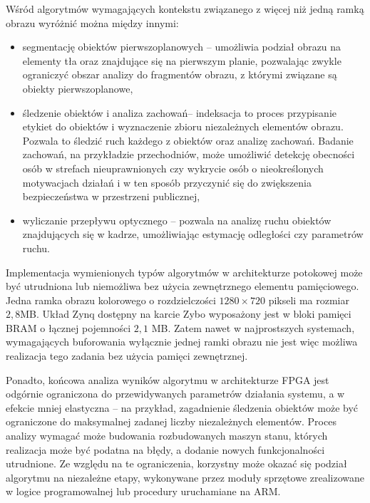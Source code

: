 Wśród algorytmów wymagających kontekstu związanego z więcej niż jedną ramką obrazu wyróżnić można między innymi:
\begin{itemize}
	\item segmentację obiektów pierwszoplanowych -- umożliwia podział obrazu na elementy tła oraz znajdujące się na pierwszym planie, pozwalając zwykle ograniczyć obszar analizy do fragmentów obrazu, z którymi związane są obiekty pierwszoplanowe,

	\item śledzenie obiektów i analiza zachowań-- indeksacja to proces przypisanie etykiet do obiektów i wyznaczenie zbioru niezależnych elementów obrazu. Pozwala to śledzić ruch każdego z obiektów oraz analizę zachowań. Badanie zachowań, na przykładzie przechodniów, może umożliwić detekcję obecności osób w strefach nieuprawnionych czy wykrycie osób o nieokreślonych motywacjach działań i w ten sposób przyczynić się do zwiększenia bezpieczeństwa w przestrzeni publicznej,
	
	\item wyliczanie przepływu optycznego -- pozwala na analizę ruchu obiektów znajdujących się w kadrze, umożliwiając estymację odległości czy parametrów ruchu.

\end{itemize}

Implementacja wymienionych typów algorytmów w architekturze potokowej może być utrudniona lub niemożliwa bez użycia zewnętrznego elementu pamięciowego. 
Jedna ramka obrazu kolorowego o rozdzielczości $1280 \times 720$ pikseli ma rozmiar $2,8$MB. 
Układ Zynq dostępny na karcie Zybo wyposażony jest w bloki pamięci BRAM o łącznej pojemności $2,1$ MB. 
Zatem nawet w najprostszych systemach, wymagających buforowania wyłącznie jednej ramki obrazu nie jest więc możliwa realizacja tego zadania bez użycia pamięci zewnętrznej.

Ponadto, końcowa analiza wyników algorytmu w architekturze FPGA jest odgórnie ograniczona do przewidywanych parametrów działania systemu, a w efekcie mniej elastyczna -- na przykład, zagadnienie śledzenia obiektów może być ograniczone do maksymalnej zadanej liczby niezależnych elementów. Proces analizy wymagać może budowania rozbudowanych maszyn stanu, których realizacja może być podatna na błędy, a dodanie nowych funkcjonalności utrudnione.
Ze względu na te ograniczenia, korzystny może okazać się podział algorytmu na niezależne etapy, wykonywane przez moduły sprzętowe zrealizowane w logice programowalnej lub procedury uruchamiane na ARM.  

